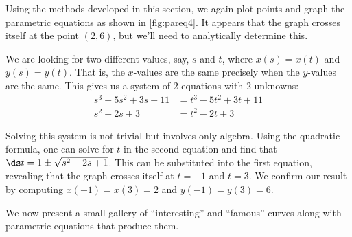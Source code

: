 {Using the methods developed in this section, we again plot points and graph the parametric equations as shown in \autoref{fig:pareq4}. It appears that the graph crosses itself at the point $(2,6)$, but we'll need to analytically determine this.

We are looking for two different values, say, $s$ and $t$, where $x(s) = x(t)$ and $y(s) = y(t)$. That is, the $x$-values are the same precisely when the $y$-values are the same. This gives us a system of 2 equations with 2 unknowns:
\begin{align*}
s^3-5s^2+3s+11 &= t^3-5t^2+3t+11 \\
s^2-2s+3 &= t^2-2t+3
\end{align*}

Solving this system is not trivial but involves only algebra. Using the qua\-dra\-tic formula, one can solve for $t$ in the second equation and find that $\ds t = 1\pm \sqrt{s^2-2s+1}$. This can be substituted into the first equation, revealing that the graph crosses itself at $t=-1$ and $t=3$. We confirm our result by computing $x(-1) = x(3)=2$ and $y(-1) = y(3) = 6$.}


We now present a small gallery of ``interesting'' and ``famous'' curves along with parametric equations that produce them.

\clearpage

